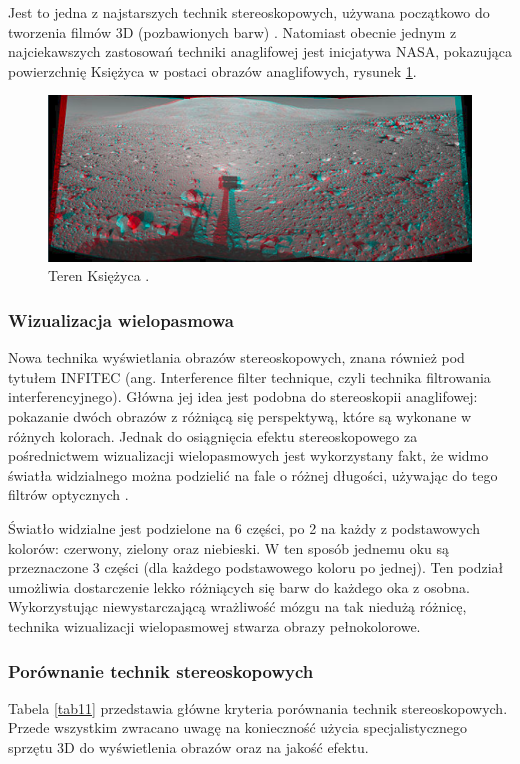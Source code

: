 Jest to jedna z najstarszych technik stereoskopowych, używana początkowo do tworzenia filmów 3D (pozbawionych barw) \cite{anaglifInfo}. Natomiast obecnie jednym z najciekawszych zastosowań techniki anaglifowej jest inicjatywa NASA, pokazująca powierzchnię Księżyca w postaci obrazów anaglifowych, rysunek \ref{rys4}.

\begin{figure}[H]
		\centering
 		\includegraphics[width=12.5cm]{NASA.png}
    	\caption{Teren Księżyca \cite{anaglif}.}
 		\label{rys4}
\end{figure}

\subsubsection{Wizualizacja wielopasmowa}
Nowa technika wyświetlania obrazów stereoskopowych, znana również pod tytułem INFITEC (ang. Interference filter technique, czyli technika filtrowania interferencyjnego). Główna jej idea jest podobna do stereoskopii anaglifowej: pokazanie dwóch obrazów z różniącą się perspektywą, które są wykonane w różnych kolorach. Jednak do osiągnięcia efektu stereoskopowego za pośrednictwem wizualizacji wielopasmowych jest wykorzystany fakt, że widmo światła widzialnego można podzielić na fale o różnej długości, używając do tego filtrów optycznych \cite{infitec}.

Światło widzialne jest podzielone na 6 części, po 2 na każdy z podstawowych kolorów: czerwony, zielony oraz niebieski. W ten sposób jednemu oku są przeznaczone 3 części (dla każdego podstawowego koloru po jednej). Ten podział umożliwia dostarczenie lekko różniących się barw do każdego oka z osobna. Wykorzystując niewystarczającą wrażliwość mózgu na tak niedużą różnicę, technika wizualizacji wielopasmowej stwarza obrazy pełnokolorowe. 

\subsubsection{Porównanie technik stereoskopowych}
Tabela \ref{tab11} przedstawia główne kryteria porównania technik stereoskopowych. Przede wszystkim zwracano uwagę na konieczność użycia  specjalistycznego sprzętu 3D do wyświetlenia obrazów oraz na jakość efektu. 

